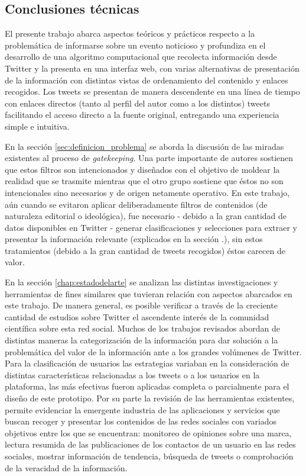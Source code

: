 \subsection{Conclusiones técnicas}

El presente trabajo abarca aspectos teóricos y prácticos respecto a la problemática
de informarse sobre un evento noticioso y profundiza en el desarrollo de una algoritmo computacional que recolecta información desde Twitter y la presenta en una interfaz web, con varias alternativas de presentación de la información con distintas vistas de ordenamiento del contenido y enlaces recogidos. Los tweets se presentan de manera descendente en una línea de tiempo con enlaces directos (tanto al perfil del autor como a los distintos) tweets facilitando el acceso directo a la fuente original, entregando una experiencia simple e intuitiva.

En la sección \ref{sec:definicion_problema} se aborda la discusión de las miradas existentes al proceso de \emph{gatekeeping}. Una parte importante de autores sostienen que estos filtros son intencionados y diseñados con el objetivo de moldear la realidad que se trasmite mientras que el otro grupo sostiene que éstos no son intencionales sino necesarios y de origen netamente operativo. En este trabajo, aún cuando se evitaron aplicar deliberadamente filtros de contenidos (de naturaleza editorial o ideológica), fue necesario - debido a la gran cantidad de datos disponibles en Twitter -  generar clasificaciones y selecciones para extraer y presentar la información relevante (explicados en la sección \label{chap:propuesta_cap}.), sin estos tratamientos (debido a la gran cantidad de tweets recogidos) éstos carecen de valor.

En la sección \ref{chap:estadodelarte} se analizan las distintas investigaciones y herramientas de fines similares que tuvieran relación con aspectos abarcados en este trabajo. De manera general, es posible verificar a través de la creciente  cantidad de estudios sobre Twitter el ascendente interés de la comunidad científica sobre esta red social. Muchos de los trabajos revisados abordan de distintas maneras la categorización de la información para dar solución a la problemática del valor de la información ante a los grandes volúmenes de Twitter. Para la clasificación de usuarios las estrategias variaban en la consideración de distintas características relacionadas a los tweets o a los usuarios en la plataforma, las más efectivas fueron aplicadas completa o parcialmente para el diseño de este prototipo. Por su parte la revisión de las herramientas existentes, permite evidenciar la emergente industria de las aplicaciones y servicios que buscan recoger y presentar los contenidos de las redes sociales con variados objetivos entre los que se encuentran: monitoreo de opiniones sobre una marca, lectura resumida de las publicaciones de los contactos de un usuario en las redes sociales, mostrar información de tendencia, búsqueda de tweets o comprobación de la veracidad de la información.

